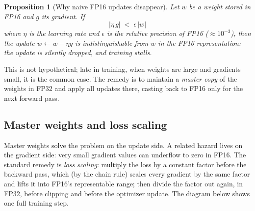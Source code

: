 \documentclass[11pt,a4paper]{article}
\theoremstyle{definition}
\theoremstyle{remark}
\theoremstyle{plain}
\newtheorem{proposition}[definition]{Proposition}
\begin{document}
\begin{proposition}[Why naive FP16 updates disappear]
Let $w$ be a weight stored in FP16 and $g$ its gradient. If
\[
|\eta\, g| \;<\; \epsilon\, |w|
\]
where $\eta$ is the learning rate and $\epsilon$ is the relative
precision of FP16 ($\approx 10^{-3}$), then the update
$w \gets w - \eta g$ is indistinguishable from $w$ in the FP16
representation: the update is silently dropped, and training stalls.
\end{proposition}

This is not hypothetical; late in training, when weights are large and
gradients small, it is the common case. The remedy is to maintain a
\emph{master copy} of the weights in FP32 and apply all updates there,
casting back to FP16 only for the next forward pass.


\subsection{Master weights and loss scaling}

Master weights solve the problem on the update side. A related hazard
lives on the gradient side: very small gradient values can underflow to
zero in FP16. The standard remedy is \emph{loss scaling}: multiply the
loss by a constant factor before the backward pass, which (by the chain
rule) scales every gradient by the same factor and lifts it into FP16's
representable range; then divide the factor out again, in FP32, before
clipping and before the optimizer update. The diagram below shows one full
training step.
\end{document}
